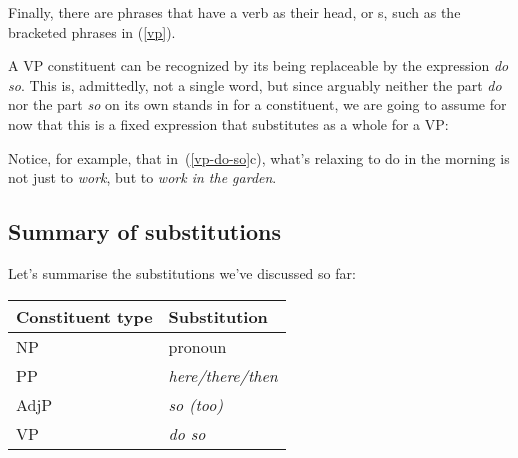 \documentclass{article}
\begin{document}
Finally, there are phrases that have a verb as their head,  or s, such as the bracketed phrases in (\ref{vp}).
\begin{exe}
    \label{vp}
\end{exe}

A VP constituent can be recognized by its being replaceable by the expression \emph{do so}.
This is, admittedly, not a single word, but since arguably neither the part \emph{do} nor the part \emph{so} on its own stands in for a constituent, we are going to assume for now that this is a fixed expression that substitutes as a whole for a VP:
\begin{exe}
     \label{vp-do-so}
\end{exe}

Notice, for example, that in~(\ref{vp-do-so}c), what's relaxing to do in the morning is not just to \emph{work}, but to \emph{work in the garden}.

    \subsection{Summary of substitutions}
Let's summarise the substitutions we've discussed so far:

\begin{center}
\begin{tabular}{ll}
    Constituent type & Substitution \\\hline
    NP & pronoun \\
    PP & \emph{here/there/then} \\
    AdjP & \emph{so (too)} \\
    VP & \emph{do so} \\
\end{tabular}
\end{center}
\end{document}
